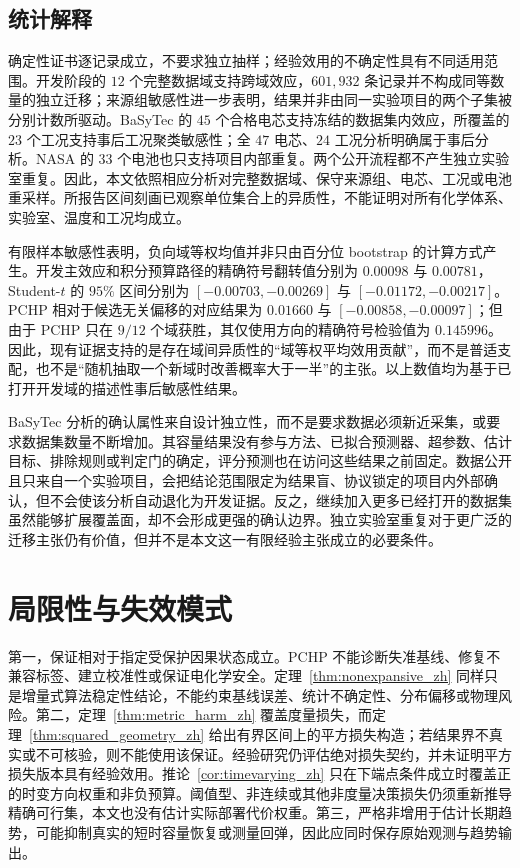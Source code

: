 \documentclass[UTF8,11pt]{ctexart}
\begin{document}
\subsection{统计解释}

确定性证书逐记录成立，不要求独立抽样；经验效用的不确定性具有不同适用范围。开发阶段的 $12$ 个完整数据域支持跨域效应，$601{,}932$ 条记录并不构成同等数量的独立迁移；来源组敏感性进一步表明，结果并非由同一实验项目的两个子集被分别计数所驱动。BaSyTec 的 $45$ 个合格电芯支持冻结的数据集内效应，所覆盖的 $23$ 个工况支持事后工况聚类敏感性；全 $47$ 电芯、$24$ 工况分析明确属于事后分析。NASA 的 $33$ 个电池也只支持项目内部重复。两个公开流程都不产生独立实验室重复。因此，本文依照相应分析对完整数据域、保守来源组、电芯、工况或电池重采样。所报告区间刻画已观察单位集合上的异质性，不能证明对所有化学体系、实验室、温度和工况均成立。

有限样本敏感性表明，负向域等权均值并非只由百分位 bootstrap 的计算方式产生。开发主效应和积分预算路径的精确符号翻转值分别为 $0.00098$ 与 $0.00781$，Student-$t$ 的 $95\%$ 区间分别为 $[-0.00703,-0.00269]$ 与 $[-0.01172,-0.00217]$。PCHP 相对于候选无关偏移的对应结果为 $0.01660$ 与 $[-0.00858,-0.00097]$；但由于 PCHP 只在 $9/12$ 个域获胜，其仅使用方向的精确符号检验值为 $0.145996$。因此，现有证据支持的是存在域间异质性的“域等权平均效用贡献”，而不是普适支配，也不是“随机抽取一个新域时改善概率大于一半”的主张。以上数值均为基于已打开开发域的描述性事后敏感性结果。

BaSyTec 分析的确认属性来自设计独立性，而不是要求数据必须新近采集，或要求数据集数量不断增加。其容量结果没有参与方法、已拟合预测器、超参数、估计目标、排除规则或判定门的确定，评分预测也在访问这些结果之前固定。数据公开且只来自一个实验项目，会把结论范围限定为结果盲、协议锁定的项目内外部确认，但不会使该分析自动退化为开发证据。反之，继续加入更多已经打开的数据集虽然能够扩展覆盖面，却不会形成更强的确认边界。独立实验室重复对于更广泛的迁移主张仍有价值，但并不是本文这一有限经验主张成立的必要条件。

\section{局限性与失效模式}

第一，保证相对于指定受保护因果状态成立。PCHP 不能诊断失准基线、修复不兼容标签、建立校准性或保证电化学安全。定理~\ref{thm:nonexpansive_zh} 同样只是增量式算法稳定性结论，不能约束基线误差、统计不确定性、分布偏移或物理风险。第二，定理~\ref{thm:metric_harm_zh} 覆盖度量损失，而定理~\ref{thm:squared_geometry_zh} 给出有界区间上的平方损失构造；若结果界不真实或不可核验，则不能使用该保证。经验研究仍评估绝对损失契约，并未证明平方损失版本具有经验效用。推论~\ref{cor:timevarying_zh} 只在下端点条件成立时覆盖正的时变方向权重和非负预算。阈值型、非连续或其他非度量决策损失仍须重新推导精确可行集，本文也没有估计实际部署代价权重。第三，严格非增用于估计长期趋势，可能抑制真实的短时容量恢复或测量回弹，因此应同时保存原始观测与趋势输出。
\end{document}
